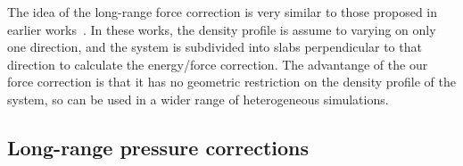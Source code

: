 \documentclass[aps,pre,preprint]{revtex4}
\renewcommand{\v}[1]{\textbf{\textit{#1}}}
\begin{document}
The idea of the long-range force correction is very similar to those
proposed in earlier works~\cite{guo1997long, mecke1997molecular,
  janecek2006long, shen2007comparative}. In these works, the density
profile is assume to varying on only one direction, and the system is
subdivided into slabs perpendicular to that direction to calculate the
energy/force correction. The advantange of the our force correction is
that it has no geometric restriction on the density profile of the
system, so can be used in a wider range of heterogeneous simulations.





\subsection{Long-range pressure corrections}

\end{document}
